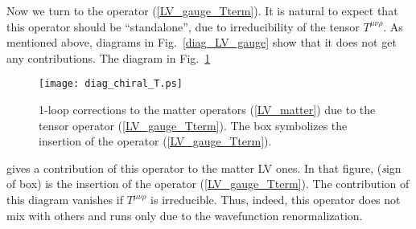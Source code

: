 \documentclass[a4paper,12pt]{article}
\begin{document}
	Now we turn to the operator (\ref{LV_gauge_Tterm}).
	It is natural to expect that this operator should be 
	``standalone'', due to irreducibility of the tensor
	$ T^{\mu\nu\rho} $. 
	As mentioned above, diagrams in
Fig.~\ref{diag_LV_gauge}
	show that it does not get any contributions. 
	The diagram in
Fig.~\ref{diag_LV_gauge_Tterm}
\begin{figure}[h]
\caption{\label{diag_LV_gauge_Tterm}
        1-loop corrections to the matter operators (\ref{LV_matter})
	due to the tensor operator (\ref{LV_gauge_Tterm}).
	The box symbolizes the insertion of the operator
	(\ref{LV_gauge_Tterm}).
}
\begin{center}
\texttt{[image: diag\_chiral\_T.ps]}
\end{center}
\end{figure}
	gives a contribution of this operator to the matter
	LV ones. 
	In that figure, ({\emph sign of box}) is the insertion of the 
	operator
	(\ref{LV_gauge_Tterm}).
	The contribution of this diagram vanishes if 
	$ T^{\mu\nu\rho} $
	is irreducible.
	Thus, indeed, this operator does not mix with others and
	runs only due to the wavefunction renormalization. 
	
\end{document}
